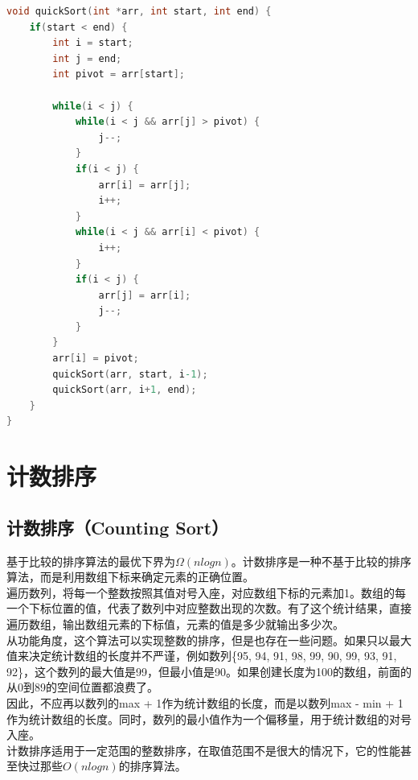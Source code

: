 
\begin{lstlisting}[language=C]
void quickSort(int *arr, int start, int end) {
    if(start < end) {
        int i = start;
        int j = end;
        int pivot = arr[start];

        while(i < j) {
            while(i < j && arr[j] > pivot) {
                j--;
            }
            if(i < j) {
                arr[i] = arr[j];
                i++;
            }
            while(i < j && arr[i] < pivot) {
                i++;
            }
            if(i < j) {
                arr[j] = arr[i];
                j--;
            }
        }
        arr[i] = pivot;
        quickSort(arr, start, i-1);
        quickSort(arr, i+1, end);
    } 
}
\end{lstlisting}

\newpage

\section{计数排序}

\subsection{计数排序（Counting Sort）}

基于比较的排序算法的最优下界为$ \Omega(nlogn) $。计数排序是一种不基于比较的排序算法，而是利用数组下标来确定元素的正确位置。\\

遍历数列，将每一个整数按照其值对号入座，对应数组下标的元素加1。数组的每一个下标位置的值，代表了数列中对应整数出现的次数。有了这个统计结果，直接遍历数组，输出数组元素的下标值，元素的值是多少就输出多少次。\\

从功能角度，这个算法可以实现整数的排序，但是也存在一些问题。如果只以最大值来决定统计数组的长度并不严谨，例如数列\{95, 94, 91, 98, 99, 90, 99, 93, 91, 92\}，这个数列的最大值是99，但最小值是90。如果创建长度为100的数组，前面的从0到89的空间位置都浪费了。\\

因此，不应再以数列的max + 1作为统计数组的长度，而是以数列max - min + 1作为统计数组的长度。同时，数列的最小值作为一个偏移量，用于统计数组的对号入座。\\

计数排序适用于一定范围的整数排序，在取值范围不是很大的情况下，它的性能甚至快过那些$ O(nlogn) $的排序算法。\\


